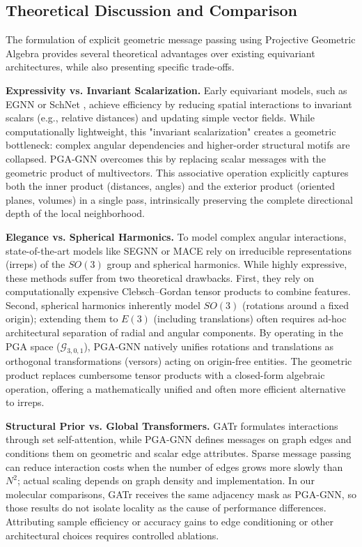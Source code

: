 \documentclass[10pt]{article}
\begin{document}
\subsection{Theoretical Discussion and Comparison}
\label{sec:discussion}

\noindent
The formulation of explicit geometric message passing using Projective Geometric Algebra provides several theoretical advantages over existing equivariant architectures, while also presenting specific trade-offs.


\noindent
\textbf{Expressivity vs. Invariant Scalarization.}
Early equivariant models, such as EGNN \citep{egnn} or SchNet \citep{schnet}, achieve efficiency by reducing spatial interactions to invariant scalars (e.g., relative distances) and updating simple vector fields. While computationally lightweight, this "invariant scalarization" creates a geometric bottleneck: complex angular dependencies and higher-order structural motifs are collapsed. PGA-GNN overcomes this by replacing scalar messages with the geometric product of multivectors. This associative operation explicitly captures both the inner product (distances, angles) and the exterior product (oriented planes, volumes) in a single pass, intrinsically preserving the complete directional depth of the local neighborhood.


\noindent
\textbf{Elegance vs. Spherical Harmonics.}
To model complex angular interactions, state-of-the-art models like SEGNN \citep{segnn} or MACE \citep{mace} rely on irreducible representations (irreps) of the $SO(3)$ group and spherical harmonics. While highly expressive, these methods suffer from two theoretical drawbacks. First, they rely on computationally expensive Clebsch--Gordan tensor products to combine features. Second, spherical harmonics inherently model $SO(3)$ (rotations around a fixed origin); extending them to $E(3)$ (including translations) often requires ad-hoc architectural separation of radial and angular components. By operating in the PGA space ($\mathcal{G}_{3,0,1}$), PGA-GNN natively unifies rotations and translations as orthogonal transformations (versors) acting on origin-free entities. The geometric product replaces cumbersome tensor products with a closed-form algebraic operation, offering a mathematically unified and often more efficient alternative to irreps.


\noindent
\textbf{Structural Prior vs. Global Transformers.}
GATr \citep{gatr} formulates interactions through set self-attention, while PGA-GNN defines messages on graph edges and conditions them on geometric and scalar edge attributes. Sparse message passing can reduce interaction costs when the number of edges grows more slowly than $N^2$; actual scaling depends on graph density and implementation. In our molecular comparisons, GATr receives the same adjacency mask as PGA-GNN, so those results do not isolate locality as the cause of performance differences. Attributing sample efficiency or accuracy gains to edge conditioning or other architectural choices requires controlled ablations.
\end{document}
